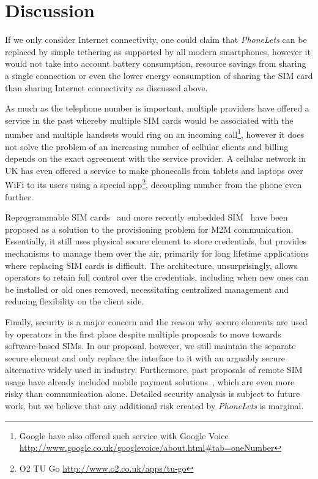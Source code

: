 \documentclass{sig-alternate-10pt}
\begin{document}
\section{Discussion}

If we only consider Internet connectivity, one could claim that \emph{PhoneLets} can be replaced by simple tethering as supported by all modern smartphones, however it would not take into account battery consumption, resource savings from sharing a single connection or even the lower energy consumption of sharing the SIM card than sharing Internet connectivity as discussed above.

As much as the telephone number is important, multiple providers have offered a service in the past whereby multiple SIM cards would be associated with the number and multiple handsets would ring on an incoming call\footnote{Google have also offered such service with Google Voice \url{http://www.google.co.uk/googlevoice/about.html\#tab=oneNumber}}, however it does not solve the problem of an increasing number of cellular clients and billing depends on the exact agreement with the service provider. A cellular network in UK has even offered a service to make phonecalls from tablets and laptops over WiFi to its users using a special app\footnote{O2 TU Go \url{http://www.o2.co.uk/apps/tu-go}}, decoupling number from the phone even further.

Reprogrammable SIM cards~\cite{OFcom:2012tx} and more recently embedded SIM~\cite{Association:2013ub} have been proposed as a solution to the provisioning problem for M2M communication. Essentially, it still uses physical secure element to store credentials, but provides mechanisms to manage them over the air, primarily for long lifetime applications where replacing SIM cards is difficult. The architecture, unsurprisingly, allows operators to retain full control over the credentials, including when new ones can be installed or old ones removed, necessitating centralized management and reducing flexibility on the client side.

Finally, security is a major concern and the reason why secure elements are used by operators in the first place despite multiple proposals to move towards software-based SIMs. In our proposal, however, we still maintain the separate secure element and only replace the interface to it with an arguably secure alternative widely used in industry. Furthermore, past proposals of remote SIM usage have already included mobile payment solutions~\cite{subramanian2003sim}, which are even more risky than communication alone. Detailed security analysis is subject to future work, but we believe that any additional risk created by \emph{PhoneLets} is marginal.
\end{document}
